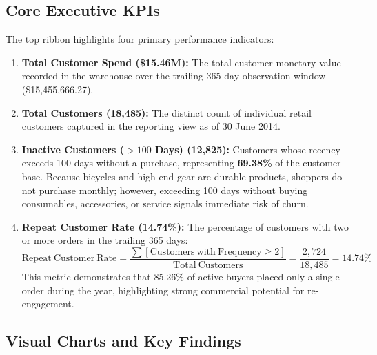 \subsection{Core Executive KPIs}
\label{subsec:bi_page1_kpis}
The top ribbon highlights four primary performance indicators:
\begin{enumerate}
    \item \textbf{Total Customer Spend (\$15.46M):} The total customer monetary value recorded in the warehouse over the trailing 365-day observation window (\$15,455,666.27).
    \item \textbf{Total Customers (18,485):} The distinct count of individual retail customers captured in the reporting view as of 30 June 2014.
    \item \textbf{Inactive Customers ($> 100$ Days) (12,825):} Customers whose recency exceeds 100 days without a purchase, representing \textbf{69.38\%} of the customer base. Because bicycles and high-end gear are durable products, shoppers do not purchase monthly; however, exceeding 100 days without buying consumables, accessories, or service signals immediate risk of churn.
    \item \textbf{Repeat Customer Rate (14.74\%):} The percentage of customers with two or more orders in the trailing 365 days:
    \begin{equation}
        \mathrm{Repeat\ Customer\ Rate} = \frac{\sum [ \mathrm{Customers\ with\ Frequency} \ge 2 ]}{\mathrm{Total\ Customers}} = \frac{2{,}724}{18{,}485} = 14.74\%
    \end{equation}
    This metric demonstrates that 85.26\% of active buyers placed only a single order during the year, highlighting strong commercial potential for re-engagement.
\end{enumerate}

\subsection{Visual Charts and Key Findings}
\label{subsec:bi_page1_insights}
